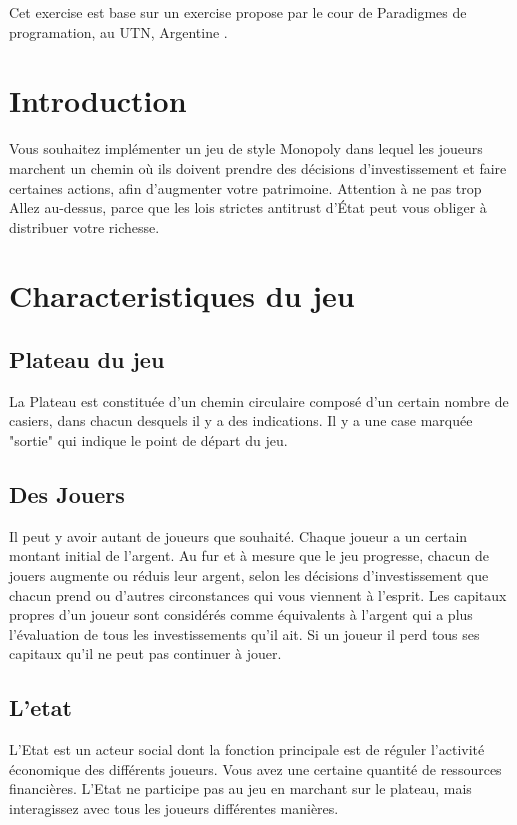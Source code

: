 \documentclass[12pt]{article}
\begin{document}
\maketitle
Cet exercise est base sur un exercise propose par le cour de Paradigmes de programation, au UTN, Argentine .

\section{Introduction}

Vous souhaitez implémenter un jeu de style Monopoly dans lequel les joueurs marchent un chemin où
ils doivent prendre des décisions d'investissement et faire certaines actions, afin d'augmenter votre
patrimoine. Attention à ne pas trop Allez au-dessus, parce que les lois strictes antitrust d'État peut vous obliger à
distribuer votre richesse.


\section{Characteristiques du jeu}

    \subsection{Plateau du jeu}
    La Plateau est constituée d'un chemin circulaire composé d'un certain nombre de casiers,
dans chacun desquels il y a des indications. Il y a une case marquée "sortie" qui
indique le point de départ du jeu.

    \subsection{Des Jouers}
    Il peut y avoir autant de joueurs que souhaité. Chaque joueur a un certain
montant initial de l'argent. Au fur et à mesure que le jeu progresse, chacun de jouers augmente
ou réduis leur argent, selon les décisions d'investissement que chacun prend ou d'autres
circonstances qui vous viennent à l’esprit. Les capitaux propres d'un joueur sont considérés comme équivalents à
l'argent qui a plus l'évaluation de tous les investissements qu'il ait. Si un joueur
il perd tous ses capitaux qu'il ne peut pas continuer à jouer.

    
    \subsection{L'etat}
    L'Etat est un acteur social dont la fonction principale est de réguler l'activité économique des
différents joueurs. Vous avez une certaine quantité de ressources financières.  L'Etat ne participe pas
au jeu en marchant sur le plateau, mais interagissez avec tous les joueurs différentes manières.
\end{document}
